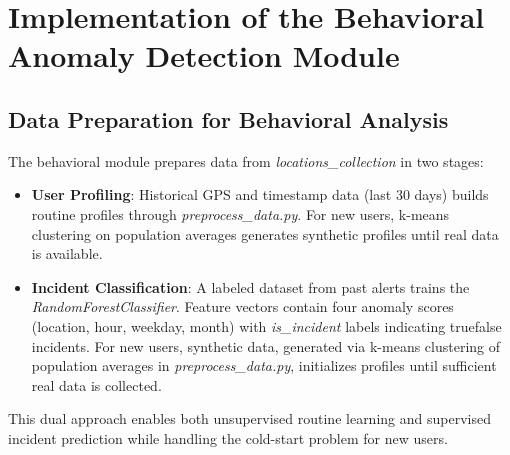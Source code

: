 \documentclass[12pt,a4paper,oneside,english]{book}
\begin{document}
{\section{Implementation of the Behavioral Anomaly Detection Module} %

\subsection{Data Preparation for Behavioral Analysis}
\label{sec:Data_behav}
The behavioral module prepares data from \textit{locations\_collection} in two stages:
\begin{itemize}
\item \textbf{User Profiling}: Historical GPS and timestamp data (last 30 days) builds routine profiles through \textit{preprocess\_data.py}. For new users, k-means clustering on population averages generates synthetic profiles until real data is available.
\item \textbf{Incident Classification}: A labeled dataset from past alerts trains the \textit{RandomForestClassifier}. Feature vectors contain four anomaly scores (location, hour, weekday, month) with \textit{is\_incident} labels indicating true\/false incidents. For new users, synthetic data, generated via k-means clustering of population averages in \textit{preprocess\_data.py}, initializes profiles until sufficient real data is collected.
\end{itemize}
This dual approach enables both unsupervised routine learning and supervised incident prediction while handling the cold-start problem for new users.

}
\end{document}
